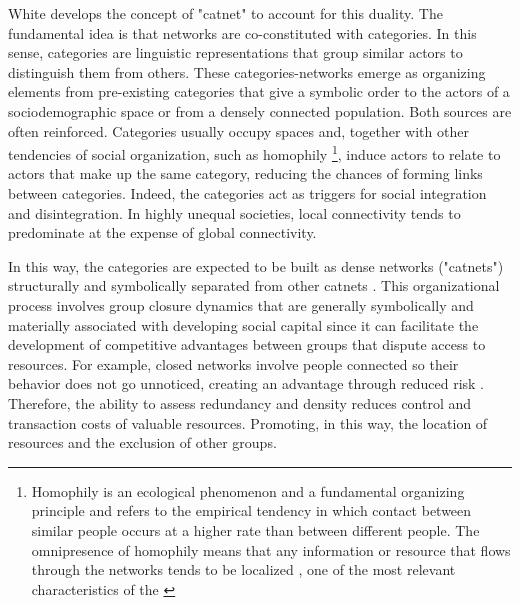 White \parencite*{white_identity_2008} develops the concept of "catnet" to account for this duality. The fundamental idea is that networks are co-constituted with categories. In this sense, categories are linguistic representations that group similar actors to distinguish them from others. These categories-networks emerge as organizing elements from pre-existing categories that give a symbolic order to the actors of a sociodemographic space or from a densely connected population. Both sources are often reinforced. Categories usually occupy spaces and, together with other tendencies of social organization, such as homophily \footnote{Homophily is an ecological phenomenon and a fundamental organizing principle \parencite{blau_inequality_1977, mcpherson_birds_2001} and refers to the empirical tendency in which contact between similar people occurs at a higher rate than between different people. The omnipresence of homophily means that any information or resource that flows through the networks tends to be localized \parencite{small_enormous_2021}, one of the most relevant characteristics of the \parencite{mcpherson_baseline_2009, small_someone_2017, smith_social_2014}}, induce actors to relate to actors that make up the same category, reducing the chances of forming links between categories. Indeed, the categories act as triggers for social integration and disintegration. In highly unequal societies, local connectivity tends to predominate at the expense of global connectivity.
\bigskip

In this way, the categories are expected to be built as dense networks ("catnets") structurally and symbolically separated from other catnets \parencite{white_identity_2008}. This organizational process involves group closure dynamics that are generally symbolically and materially associated with developing social capital \parencite{burt_brokerage_2005} since it can facilitate the development of competitive advantages between groups that dispute access to resources. For example, closed networks involve people connected so their behavior does not go unnoticed, creating an advantage through reduced risk \parencite{burt_brokerage_2005}. Therefore, the ability to assess redundancy and density reduces control and transaction costs of valuable resources. Promoting, in this way, the location of resources and the exclusion of other groups.
\bigskip

